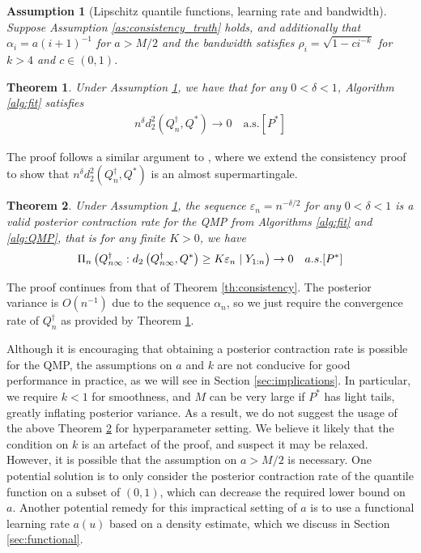 \documentclass[11pt,a4paper]{article}
\newtheorem{theorem}{Theorem}%
\newtheorem{assumption}{Assumption}%
\newenvironment{proof_outline}{\begin{proof}[Proof outline]}{\end{proof}}
\begin{document}
\begin{assumption}[Lipschitz quantile functions, learning rate and bandwidth]\label{as:contraction_init}
   Suppose {Assumption \ref{as:consistency_truth}} holds, and
     additionally that $\alpha_i =  a(i+1)^{-1}$ for  $a > M/2$ and the bandwidth satisfies $\rho_i = \sqrt{1- ci^{-k}}$ 
    for $k > 4$ and $c \in (0,1)$.
\end{assumption}
\begin{theorem}\label{th:contraction_mean}
    Under {Assumption \ref{as:contraction_init}}, we have that for any $0< \delta < 1$, {Algorithm \ref{alg:fit}} satisfies 
    \begin{align*}
n^{\delta}d^2_2\left(Q_n^{\dagger},Q^*\right) \to 0 \quad \text{a.s.}[P^*]
    \end{align*}
\end{theorem}
\begin{proof_outline}
    The proof follows a similar argument to \cite{Aboubacar2014}, where we extend the consistency proof to show that $n^{\delta}d^2_2(Q_n^{\dagger},Q^*) $ is an almost supermartingale. 
\end{proof_outline}
\begin{theorem}\label{th:contraction}
Under {Assumption \ref{as:contraction_init}}, the sequence $\varepsilon_n = n^{-\delta/2}$ for any $0 < \delta < 1$ is a valid posterior contraction rate for the QMP from {Algorithms \ref{alg:fit}} and  {\ref{alg:QMP}}, that is for any finite $K> 0$, we have
\begin{align*}
\Pi_n\left(Q^{\dagger}_{n\infty}: d_2\left(Q^{\dagger}_{n\infty},Q^*\right) \geq K\varepsilon_n  \mid Y_{1:n}\right) \to 0 \quad \textnormal{a.s.}[P^*]  
\end{align*}
\end{theorem}
\begin{proof_outline}
    The proof continues from that of {Theorem \ref{th:consistency}}. The posterior variance is $O(n^{-1})$ due to the sequence $\alpha_n$, so we just require the convergence rate of $Q_n^{\dagger}$ as provided by {Theorem \ref{th:contraction_mean}}. 
\end{proof_outline}
Although it is encouraging that obtaining a posterior contraction rate is possible for the QMP, the assumptions on $a$ and $k$ are not conducive for good performance in practice, as we will see in Section \ref{sec:implications}. 
In particular, we require $k < 1$ for smoothness, and $M$ can be very large if $P^*$ has light tails, greatly inflating posterior variance. As a result, we do not suggest the usage of the above {Theorem \ref{th:contraction}} for hyperparameter setting. We believe it likely that the condition on $k$ is an artefact of the proof, and suspect it may be relaxed. However, it is possible that the assumption on $a > M/2$ is necessary. One potential solution is to only consider the posterior contraction rate of the quantile function on a subset of $(0,1)$, which can decrease the required lower bound on $a$. Another potential remedy for this impractical setting of $a$ is to use a functional learning rate $a(u)$ based on a density estimate, which we discuss in Section \ref{sec:functional}. 
\end{document}
